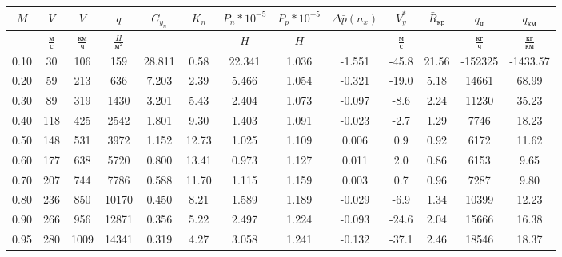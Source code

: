 \begin{tabular}{|c|c|c|c|c|c|c|c|c|c|c|c|c|}
\hline
$M$ & $V$ & $V$ & $q$ & $C_{y_n}$ & $K_n$ & $P_n*10^{-5}$ & $P_p*10^{-5}$ & $\Delta \bar{p}(n_x)$ & $V_y^*$ & $\bar{R}_{кр}$ & $q_{ч}$ & $q_{км}$ \\ 
\hline
$-$ & $\frac{м}{с}$ & $\frac{км}{ч}$ & $\frac{H}{м^2}$ & $-$ & $-$ & $H$ & $H$ & $-$ & $\frac{м}{с}$ & $-$ & $\frac{кг}{ч}$ & $\frac{кг}{км}$ \\ 
\hline
0.10 & 30 & 106 & 159 & 28.811 & 0.58 & 22.341 & 1.036 & -1.551 & -45.8 & 21.56 & -152325 & -1433.57 \\ 
\hline
0.20 & 59 & 213 & 636 & 7.203 & 2.39 & 5.466 & 1.054 & -0.321 & -19.0 & 5.18 & 14661 & 68.99 \\ 
\hline
0.30 & 89 & 319 & 1430 & 3.201 & 5.43 & 2.404 & 1.073 & -0.097 & -8.6 & 2.24 & 11230 & 35.23 \\ 
\hline
0.40 & 118 & 425 & 2542 & 1.801 & 9.30 & 1.403 & 1.091 & -0.023 & -2.7 & 1.29 & 7746 & 18.23 \\ 
\hline
0.50 & 148 & 531 & 3972 & 1.152 & 12.73 & 1.025 & 1.109 & 0.006 & 0.9 & 0.92 & 6172 & 11.62 \\ 
\hline
0.60 & 177 & 638 & 5720 & 0.800 & 13.41 & 0.973 & 1.127 & 0.011 & 2.0 & 0.86 & 6153 & 9.65 \\ 
\hline
0.70 & 207 & 744 & 7786 & 0.588 & 11.70 & 1.115 & 1.159 & 0.003 & 0.7 & 0.96 & 7287 & 9.80 \\ 
\hline
0.80 & 236 & 850 & 10170 & 0.450 & 8.21 & 1.589 & 1.189 & -0.029 & -6.9 & 1.34 & 10399 & 12.23 \\ 
\hline
0.90 & 266 & 956 & 12871 & 0.356 & 5.22 & 2.497 & 1.224 & -0.093 & -24.6 & 2.04 & 15666 & 16.38 \\ 
\hline
0.95 & 280 & 1009 & 14341 & 0.319 & 4.27 & 3.058 & 1.241 & -0.132 & -37.1 & 2.46 & 18546 & 18.37 \\ 
\hline
\end{tabular}